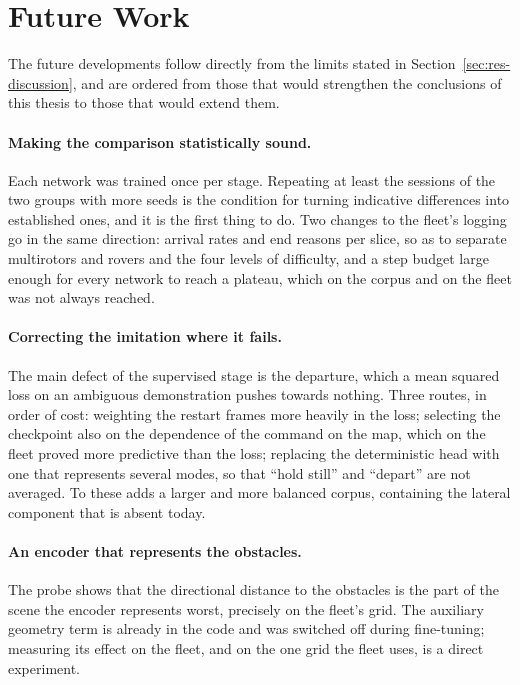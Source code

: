 \section{Future Work}
\label{sec:conclusions-future}

The future developments follow directly from the limits stated in
Section~\ref{sec:res-discussion}, and are ordered from those that would
strengthen the conclusions of this thesis to those that would extend them.

\paragraph{Making the comparison statistically sound.}
Each network was trained once per stage. Repeating at least the sessions of the
two groups with more seeds is the condition for turning indicative differences
into established ones, and it is the first thing to do. Two changes to the
fleet's logging go in the same direction: arrival rates and end reasons per
slice, so as to separate multirotors and rovers and the four levels of
difficulty, and a step budget large enough for every network to reach a
plateau, which on the corpus and on the fleet was not always reached.

\paragraph{Correcting the imitation where it fails.}
The main defect of the supervised stage is the departure, which a mean squared
loss on an ambiguous demonstration pushes towards nothing. Three routes, in
order of cost: weighting the restart frames more heavily in the loss; selecting
the checkpoint also on the dependence of the command on the map, which on the
fleet proved more predictive than the loss; replacing the
deterministic head with one that represents several modes, so that ``hold
still'' and ``depart'' are not averaged. To these adds a larger and more
balanced corpus, containing the lateral component that is absent today.

\paragraph{An encoder that represents the obstacles.}
The probe shows that the directional distance to the obstacles is the part of
the scene the encoder represents worst, precisely on the fleet's grid. The
auxiliary geometry term is already in the code and was switched off during
fine-tuning; measuring its effect on the fleet, and on the one grid the fleet
uses, is a direct experiment.


